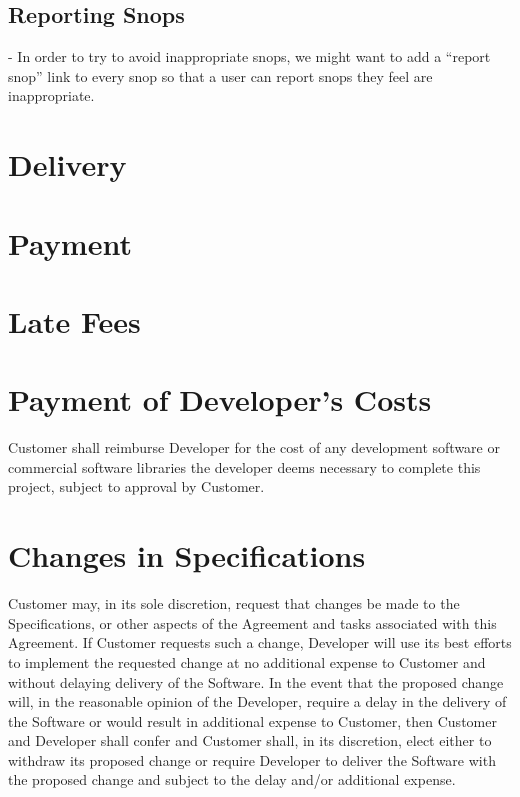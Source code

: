 \documentclass[11pt]{article}
\begin{document}
\subsection{Reporting Snops}
- In order to try to avoid inappropriate snops, we might want to add a “report snop” link to every snop so that a user can report snops they feel are inappropriate.
\section{Delivery}
\section{Payment}	
\section{Late Fees}
\section{Payment of Developer’s Costs}
Customer shall reimburse Developer for the cost of any development software or commercial software libraries the developer deems necessary to complete this project, subject to approval by Customer.
\section{Changes in Specifications}
Customer may, in its sole discretion, request that changes be made to the Specifications, or other aspects of the Agreement and tasks associated with this Agreement. If Customer requests such a change, Developer will use its best efforts to implement the requested change at no additional expense to Customer and without delaying delivery of the Software. In the event that the proposed change will, in the reasonable opinion of the Developer, require a delay in the delivery of the Software or would result in additional expense to Customer, then Customer and Developer shall confer and Customer shall, in its discretion, elect either to withdraw its proposed change or require Developer to deliver the Software with the proposed change and subject to the delay and/or additional expense.
\end{document}
